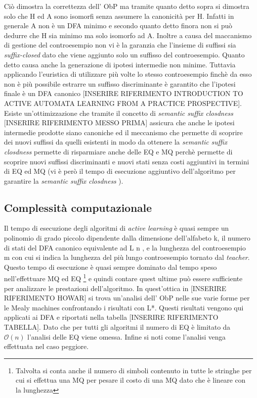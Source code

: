Ciò dimostra la correttezza dell' \ac{ObP} ma tramite quanto detto sopra si dimostra solo che \ac{H} ed A sono isomorfi senza assumere la canonicità per \ac{H}. Infatti in generale  A non è un \ac{DFA} minimo e secondo quanto detto finora non si può dedurre che \ac{H} sia minimo ma solo isomorfo  ad A. Inoltre a causa del maccanismo di gestione del controesempio non vi è la garanzia che l'insieme di suffissi sia \textit{suffix-closed} dato che viene aggiunto solo un suffisso del controesempio. Quanto detto causa anche la generazione di ipotesi intermedie non minime. Tuttavia applicando l'euristica di utilizzare più volte lo stesso controesempio finchè da esso non è più possibile estrarre un suffisso discriminante è garantito che l'ipotesi finale è un \ac{DFA} canonico [INSERIRE RIFERIMENTO INTRODUCTION TO ACTIVE AUTOMATA LEARNING FROM A PRACTICE PROSPECTIVE]. Esiste un'ottimizzazione che tramite  il concetto di \textit{semantic suffix closdness} [INSERIRE RIFERIMENTO MESSO PRIMA] assicura che anche le ipotesi intermedie prodotte siano canoniche ed il meccanismo che permette di scoprire dei nuovi suffissi da quelli esistenti in modo da ottenere la \textit{semantic suffix closdness} permette di risparmiare anche delle \ac{EQ} e \ac{MQ} perchè permette di scoprire nuovi suffissi discriminanti e nuovi stati senza costi aggiuntivi in termini di \ac{EQ} ed \ac{MQ} (vi è però il tempo di esecuzione aggiuntivo dell'algoritmo per garantire la \textit{semantic suffix closdness} ).


\subsection{Complessità computazionale}
Il tempo di esecuzione degli algoritmi di \textit{active learning} è quasi sempre un polinomio di grado piccolo dipendente dalla dimensione dell'alfabeto k, il numero di stati  del \ac{DFA} canonico  equivalente ad \ac{L} n , e la lunghezza del controesempio m con cui si indica la lunghezza del più lungo controesempio tornato dal \textit{teacher}. Questo tempo di esecuzione è quasi sempre dominato dal tempo speso nell'effettuare  \ac{MQ} ed \ac{EQ} \footnote{Talvolta si conta anche il numero di simboli contenuto in tutte le stringhe per cui si effettua una \ac{MQ} per pesare il costo di una \ac{MQ} dato che è lineare con la lunghezza} e quindi contare quest ultime può essere sufficiente per analizzare le prestazioni dell'algoritmo. In quest'ottica in [INSERIRE RIFERIMENTO HOWAR] si trova un'analisi dell' \ac{ObP} nelle sue varie forme per le  Mealy machines confrontando i risultati con L*. Questi risultati vengono qui applicati ai \ac{DFA} e riportati nella tabella [INSERIRE RIFERIMENTO TABELLA]. Dato che per tutti gli algoritmi il numero di \ac{EQ} è limitato da $\mathcal{O}(n)$ l'analisi delle \ac{EQ} viene omessa. Infine si noti come l'analisi venga effettuata nel caso peggiore.

